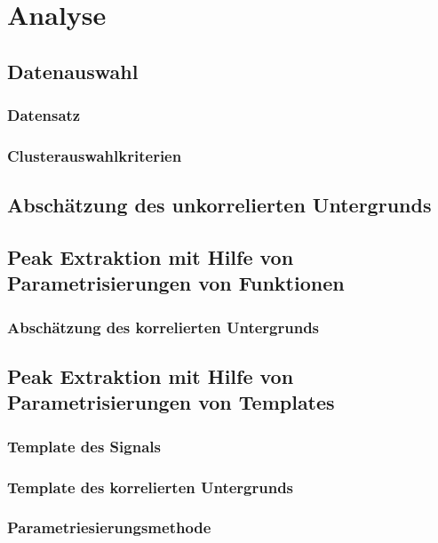 \documentclass[11pt]{article}
\begin{document}
\section{Analyse} \label{s3}

\subsection{Datenauswahl} \label{s3s1}

\subsubsection{Datensatz} \label{s3s1s1}

\subsubsection{Clusterauswahlkriterien} \label{s3s1s2}

\subsection{Absch{\"a}tzung des unkorrelierten Untergrunds} \label{s3s2}

\subsection{Peak Extraktion mit Hilfe von Parametrisierungen von Funktionen} \label{s3s3}

\subsubsection{Absch{\"a}tzung des korrelierten Untergrunds} \label{s3s3s1}

\subsection{Peak Extraktion mit Hilfe von Parametrisierungen von Templates} \label{s3s4}

\subsubsection{Template des Signals} \label{s3s4s1}

\subsubsection{Template des korrelierten Untergrunds} \label{s3s4s2}

\subsubsection{Parametriesierungsmethode} \label{s3s4s3}
\end{document}
